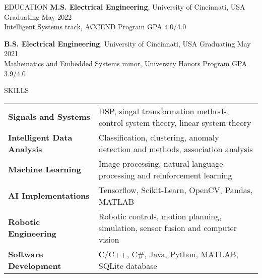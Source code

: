 \documentclass{resume} %
\begin{document}
	


	
	\begin{rSection}{EDUCATION}
	{\bf M.S. Electrical Engineering}, University of Cincinnati, USA \hfill {Graduating May 2022} \\
	Intelligent Systems track, ACCEND Program \hfill GPA 4.0/4.0 \smallskip
	
	{\bf B.S. Electrical Engineering}, University of Cincinnati, USA \hfill {Graduating May 2021}\\
	Mathematics and Embedded Systems minor, University Honors Program \hfill {GPA 3.9/4.0}
		
		
		
	\end{rSection}
	
	\begin{rSection}{SKILLS}
		
		\begin{tabular}{ @{} >{\bfseries}l @{\hspace{2ex}} l }
			Signals and Systems & DSP, singal transformation methods, control system theory, linear system theory \\
			Intelligent Data Analysis & Classification, clustering, anomaly detection and methods, association analysis \\
			Machine Learning & Image processing, natural language processing and reinforcement learning \\
			AI Implementations & Tensorflow, Scikit-Learn, OpenCV, Pandas, MATLAB\\
			Robotic Engineering &  Robotic controls, motion planning, simulation, sensor fusion and computer vision \\
			Software Development & C/C++, C\#, Java, Python, MATLAB, SQLite database \\

		\end{tabular}
	\end{rSection}
	
\end{document}
